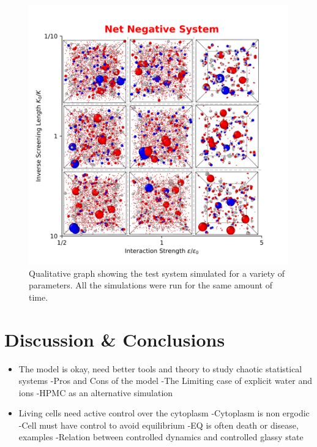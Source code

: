 \documentclass[draft, english]{volcanica-template}
\begin{document}
\begin{figure}[!htbp]
\centering
\includegraphics[width=0.7\linewidth]{files/E-K_ParamScan-TestSy-8e9d5d0081ef83d4b0cf7e14cf99835a.png}
\caption[]{Qualitative graph showing the test system simulated for a variety of parameters. All the simulations were run for the same amount of time.}
\label{Fig11_TestSys_ParamScan}
\end{figure}

\section{Discussion \& Conclusions}

\begin{itemize}
\item The model is okay, need better tools and theory to study chaotic statistical systems\newline
-Pros and Cons of the model\newline
-The Limiting case of explicit water and ions\newline
-HPMC as an alternative simulation


\item Living cells need active control over the cytoplasm\newline
-Cytoplasm is non ergodic\newline
-Cell must have control to avoid equilibrium\newline
-EQ is often death or disease, examples\newline
-Relation between controlled dynamics and controlled glassy state
\end{itemize}

%

\EndMatter
\end{document}
